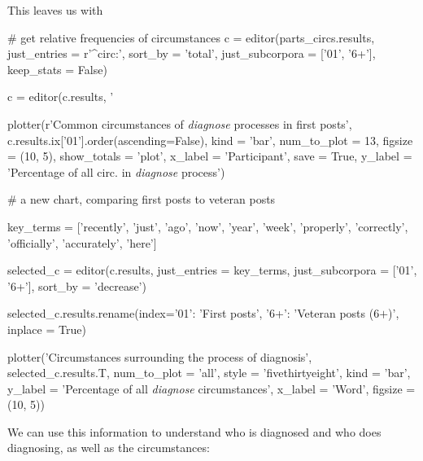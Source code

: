 This leaves us with 


\begin{pyverbatim}
# get relative frequencies of circumstances
c = editor(parts_circs.results, just_entries = r'^circ:', 
    sort_by = 'total', just_subcorpora = ['01', '6+'], keep_stats = False)

c = editor(c.results, '%

plotter(r'Common circumstances of \emph{diagnose} processes in first posts', 
    c.results.ix['01'].order(ascending=False), kind = 'bar', num_to_plot = 13, 
    figsize = (10, 5), show_totals = 'plot', x_label = 'Participant', save = True, 
    y_label = 'Percentage of all circ. in \emph{diagnose} process')

# a new chart, comparing first posts to veteran posts

key_terms = ['recently', 'just', 'ago', 'now', 'year', 'week',
             'properly', 'correctly', 'officially', 'accurately', 'here']

selected_c = editor(c.results, just_entries = key_terms, 
               just_subcorpora = ['01', '6+'], sort_by = 'decrease')

selected_c.results.rename(index={'01': 'First posts', 
    '6+': 'Veteran posts (6$+$)'}, inplace = True)

plotter('Circumstances surrounding the process of diagnosis', selected_c.results.T, 
    num_to_plot = 'all',  style = 'fivethirtyeight', kind = 'bar', 
    y_label = 'Percentage of all \emph{diagnose} circumstances', 
    x_label = 'Word', figsize = (10, 5))
\end{pyverbatim}

We can use this information to understand who is diagnosed and who does diagnosing, as well as the circumstances:

